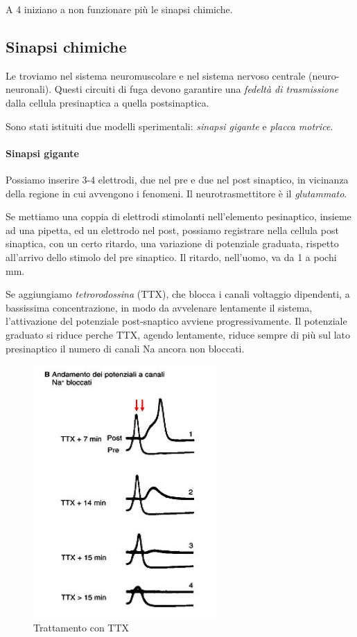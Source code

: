 \documentclass[a4paper,12pt]{article}
\begin{document}
A 4 \textcelsius iniziano a non funzionare più le sinapsi chimiche.

\subsection{Sinapsi chimiche}
Le troviamo nel sistema neuromuscolare e nel sistema nervoso centrale (neuro-neuronali). Questi circuiti di fuga devono garantire una \emph{fedeltà di trasmissione} dalla cellula presinaptica a quella postsinaptica.

Sono stati istituiti due modelli sperimentali: \emph{sinapsi gigante} e \emph{placca motrice}.

\paragraph{Sinapsi gigante}
Possiamo inserire 3-4 elettrodi, due nel pre e due nel post sinaptico, in vicinanza della regione in cui avvengono i fenomeni. Il neurotrasmettitore è il \emph{glutammato}. 

Se mettiamo una coppia di elettrodi stimolanti nell'elemento pesinaptico, insieme ad una pipetta, ed un elettrodo nel post, possiamo registrare nella cellula post sinaptica, con un certo ritardo, una variazione di potenziale graduata, rispetto all'arrivo dello stimolo del pre sinaptico. Il ritardo, nell'uomo, va da 1 a pochi mm.

Se aggiungiamo \emph{tetrorodossina} (TTX), che blocca i canali voltaggio dipendenti, a bassissima concentrazione, in modo da avvelenare lentamente il sistema, l'attivazione del potenziale post-snaptico avviene progressivamente. Il potenziale graduato si riduce perche TTX, agendo lentamente, riduce sempre di più sul lato presinaptico il numero di canali Na ancora non bloccati. 
\begin{figure}[H]
\centering
\includegraphics[scale=0.5]{immagine/sinapsi_gigante.jpg}
\caption{Trattamento con TTX}
\end{figure}
\end{document}
